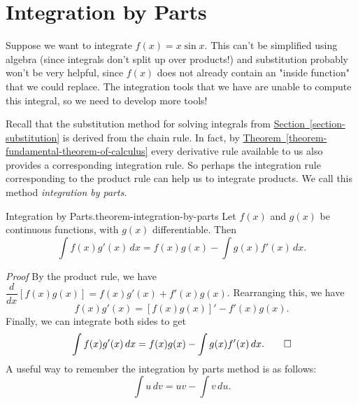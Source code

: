 \documentclass[10pt,]{book}
\makeatletter
\renewcommand*{\proofname}{Proof}
\renewenvironment{proof}[1][\proofname]{\par
  \pushQED{\qed}%
  \normalfont \topsep6\p@\@plus6\p@\relax
  \trivlist
  \item\relax
    {\itshape
    #1\@addpunct{.}}\hspace\labelsep\ignorespaces
}{%
  \popQED\endtrivlist\@endpefalse
}
\numberwithin{equation}{section}
\newcommand{\dv}[3][]{\dfrac{d^{#1} #2}{d #3^{#1}}}
\makeatother
\begin{document}
\section[{Integration by Parts}]{Integration by Parts}\label{section-integration-by-parts}
\hypertarget{p-495}{}%
Suppose we want to integrate \(f(x) = x\sin x\). This can't be simplified using algebra (since integrals don't split up over products!) and substitution probably won't be very helpful, since \(f(x)\) does not already contain an "inside function" that we could replace. The integration tools that we have are unable to compute this integral, so we need to develop more tools!%
\par
\hypertarget{p-496}{}%
Recall that the substitution method for solving integrals from \hyperref[section-substitution]{Section~\ref{section-substitution}} is derived from the chain rule. In fact, by \hyperref[theorem-fundamental-theorem-of-calculus]{Theorem~\ref{theorem-fundamental-theorem-of-calculus}} every derivative rule available to us also provides a corresponding integration rule. So perhaps the integration rule corresponding to the product rule can help us to integrate products. We call this method \emph{integration by parts}.%
\begin{theorem}{Integration by Parts.}{}{theorem-integration-by-parts}%
\hypertarget{p-497}{}%
Let \(f(x)\) and \(g(x)\) be continuous functions, with \(g(x)\) differentiable. Then%
%
\begin{equation*}
\int f(x)g'(x)\,dx = f(x)g(x) - \int g(x)f'(x)\,dx.
\end{equation*}
\end{theorem}
\begin{proof}\hypertarget{proof-12}{}
\hypertarget{p-498}{}%
By the product rule, we have \(\dv{}{x}[f(x)g(x)] = f(x)g'(x) + f'(x)g(x)\). Rearranging this, we have%
\begin{equation*}
f(x)g'(x) = [f(x)g(x)]' - f'(x)g(x).
\end{equation*}
Finally, we can integrate both sides to get%
\begin{equation*}
\int f(x)g'(x)\,dx = f(x)g(x) - \int g(x)f'(x)\,dx.\qedhere
\end{equation*}
%
\end{proof}
\hypertarget{p-499}{}%
A useful way to remember the integration by parts method is as follows:%
\begin{equation}
\int u\,dv = uv - \int v\,du.\label{equation-integration-by-parts}
\end{equation}
\end{document}
